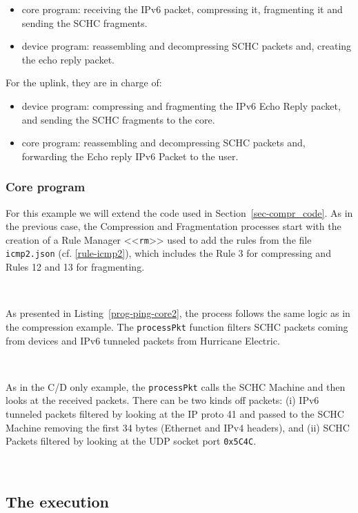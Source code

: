 \begin{itemize}
\item core program: receiving the IPv6 packet, compressing it, fragmenting it and sending the SCHC fragments.
\item device program: reassembling and decompressing SCHC packets and, creating the echo reply packet.
\end{itemize} 

For the uplink, they are in charge of: 

\begin{itemize}
\item device program: compressing and fragmenting the IPv6 Echo Reply packet, and sending the SCHC fragments to the core.
\item core program: reassembling and decompressing SCHC packets and, forwarding the Echo reply IPv6 Packet to the user.
\end{itemize} 


\subsubsection{Core program}

For this example we will extend the code used in Section~\ref{sec-compr_code}. 
As in the previous case, the Compression and Fragmentation processes start with the creation of a Rule Manager <<\texttt{rm}>> used to add the rules from the file \texttt{icmp2.json} (cf. \vref{rule-icmp2}), which includes the Rule 3 for compressing and Rules 12 and 13 for fragmenting.

~

As presented in Listing~\vref{prog-ping-core2}, the process follows the same logic as in the compression example. 
The \texttt{processPkt} function filters SCHC packets coming from devices and IPv6 tunneled packets from Hurricane Electric. 

~

As in the C/D only example, the \texttt{processPkt} calls the SCHC Machine and then looks at the received packets. 
There can be two kinds off packets: (i) IPv6 tunneled packets filtered by looking at the IP proto 41 and passed to the SCHC Machine removing the first 34 bytes (Ethernet and IPv4 headers), and (ii) SCHC Packets filtered by looking at the UDP socket port \texttt{0x5C4C}.

~



\subsection{The execution}

